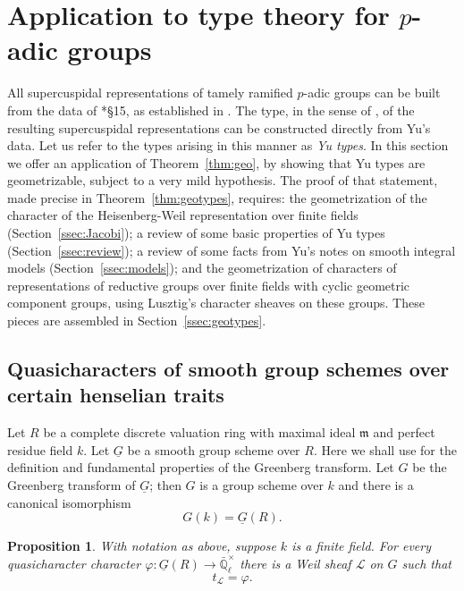 \documentclass[10pt]{amsart}
\theoremstyle{plain}
\newtheorem{proposition}[theorem]{Proposition}
\theoremstyle{definition}
\newcommand{\EE}{\mathbb{\bar Q}_\ell}
\newcommand{\Fq}{k}
\newcommand{\EEx}{\EE^\times}
\newcommand{\trFrob}[1]{t_{#1}}
\newcommand{\cs}[1]{{\mathcal{#1}}}
\begin{document}
\section{Application to type theory for \texorpdfstring{$p$}{p}-adic groups}\label{sec:types}

All supercuspidal representations of tamely ramified $p$-adic groups can be built from the data of \cite{yu:01a}*{\S 15}, as established in \cite{kim:07a}.
The type, in the sense of \cite{bushnell-kutzko:98a}, of the resulting supercuspidal representations can be constructed directly from Yu's data. 
Let us refer to the types arising in this manner as {\it Yu types}.
In this section we offer an application of Theorem~\ref{thm:geo}, by showing that Yu types are geometrizable, subject to a very mild hypothesis.
The proof of that statement, made precise in Theorem~\ref{thm:geotypes}, requires: the geometrization of the character of the Heisenberg-Weil representation over finite fields (Section~\ref{ssec:Jacobi}); a review of some basic properties of Yu types (Section~\ref{ssec:review}); a review of some facts from Yu's notes on smooth integral models (Section~\ref{ssec:models}); and the geometrization of characters of representations of reductive groups over finite fields with cyclic geometric component groups, using Lusztig's character sheaves on these groups. These pieces are assembled in Section~\ref{ssec:geotypes}. 


\subsection{Quasicharacters of smooth group schemes over certain henselian traits}


Let $R$ be a complete discrete valuation ring with maximal ideal $\mathfrak{m}$ and perfect residue field $\Fq$. 
Let $\underline{G}$ be a smooth group scheme over $R$.
Here we shall use  \cite{bertapelle-gonzales:Greenberg} for the definition and fundamental properties of the Greenberg transform.
Let $G$ be the Greenberg transform of $\underline{G}$; then $G$ is a group scheme over $\Fq$ and there is a canonical isomorphism
\[
G(\Fq) = \underline{G}(R).
\]

\begin{proposition}\label{prop:quasicharacters}
With notation as above, suppose $\Fq$ is a finite field.
For every quasicharacter character $\varphi : \underline{G}(R) \to \EEx$ there is a Weil sheaf $\cs{L}$ on $G$ such that \[\trFrob{\cs{L}} =  \varphi.\] \end{proposition}
\end{document}
